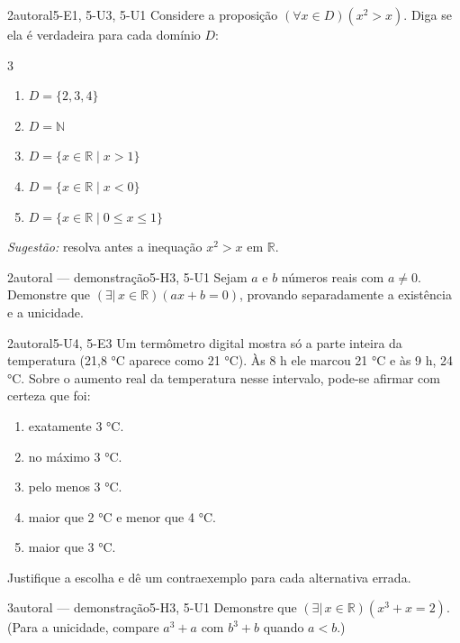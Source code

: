 \begin{questao}[integradora]{2}{autoral}{5-E1, 5-U3, 5-U1}\label{u5:q8}
Considere a proposição $(\forall x\in D)(x^2>x)$. Diga se ela é verdadeira para cada domínio $D$:
\begin{multicols}{3}
\begin{enumerate}[label=\alph*)]
  \item $D=\{2,3,4\}$
  \item $D=\mathbb{N}$
  \item $D=\{x\in\mathbb{R}\mid x>1\}$
  \item $D=\{x\in\mathbb{R}\mid x<0\}$
  \item $D=\{x\in\mathbb{R}\mid 0\le x\le1\}$
\end{enumerate}
\end{multicols}
\emph{Sugestão:} resolva antes a inequação $x^2>x$ em $\mathbb{R}$.
\end{questao}

\begin{questao}{2}{autoral — demonstração}{5-H3, 5-U1}\label{u5:q9}
Sejam $a$ e $b$ números reais com $a\neq0$. Demonstre que $(\exists|\,x\in\mathbb{R})(ax+b=0)$, provando separadamente a existência e a unicidade.
\end{questao}

\begin{questao}{2}{autoral}{5-U4, 5-E3}\label{u5:q10}
Um termômetro digital mostra só a parte inteira da temperatura (21,8 °C aparece como 21 °C). Às 8 h ele marcou 21 °C e às 9 h, 24 °C. Sobre o aumento real da temperatura nesse intervalo, pode-se afirmar com certeza que foi:
\begin{enumerate}[label=(\alph*)]
  \item exatamente 3 °C.
  \item no máximo 3 °C.
  \item pelo menos 3 °C.
  \item maior que 2 °C e menor que 4 °C.
  \item maior que 3 °C.
\end{enumerate}
Justifique a escolha e dê um contraexemplo para cada alternativa errada.
\end{questao}

\begin{questao}{3}{autoral — demonstração}{5-H3, 5-U1}\label{u5:q11}
Demonstre que $(\exists|\,x\in\mathbb{R})(x^3+x=2)$. (Para a unicidade, compare $a^3+a$ com $b^3+b$ quando $a<b$.)
\end{questao}

